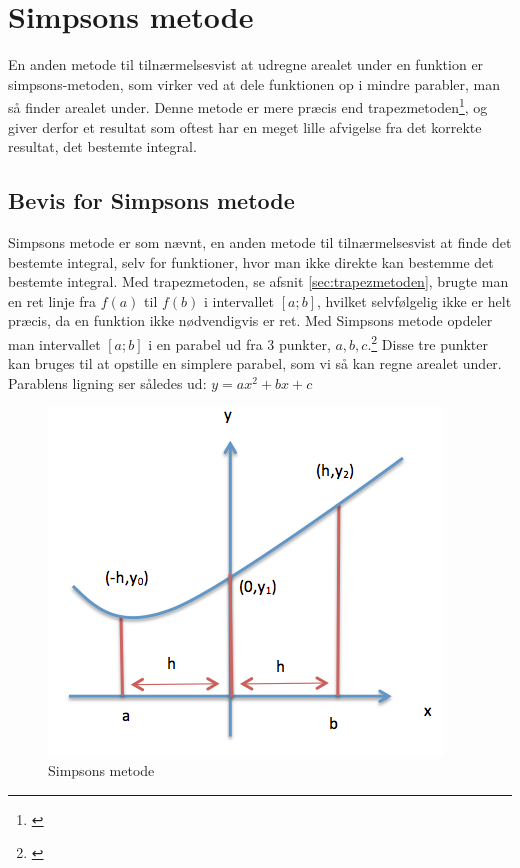 \documentclass[12pt]{article}
\numberwithin{equation}{section}
\begin{document}
\section{Simpsons metode}
\label{sec:simpsonsmetode}
En anden metode til tilnærmelsesvist at udregne arealet under en funktion er simpsons-metoden, som virker ved at dele funktionen op i mindre parabler, man så finder arealet under. Denne metode er mere præcis end trapezmetoden\footnote{\cite[s. 15]{2012matA}}, og giver derfor et resultat som oftest har en meget lille afvigelse fra det korrekte resultat, det bestemte integral.
\subsection{Bevis for Simpsons metode}
Simpsons metode er som nævnt, en anden metode til tilnærmelsesvist at finde det bestemte integral, selv for funktioner, hvor man ikke direkte kan bestemme det bestemte integral. Med trapezmetoden, se afsnit \ref{sec:trapezmetoden}, brugte man en ret linje fra $f(a)$ til $f(b)$ i intervallet $[a;b]$, hvilket selvfølgelig ikke er helt præcis, da en funktion ikke nødvendigvis er ret. Med Simpsons metode opdeler man intervallet $[a;b]$ i en parabel ud fra 3 punkter, $a,b,c$.\footnote{\cite{simpsonsmetode}} Disse tre punkter kan bruges til at opstille en simplere parabel, som vi så kan regne arealet under. Parablens ligning ser således ud: $y=ax^2+bx+c$
\begin{figure}[H]
\centering
\includegraphics[width=0.6\linewidth]{Billeder/Simpsonsmetode}
\caption{Simpsons metode}
\label{fig:simpsonsmetode}
\end{figure}
\end{document}
